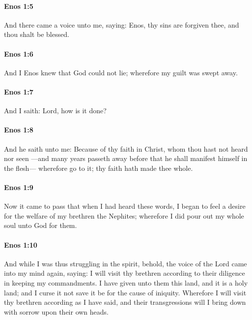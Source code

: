 		\paragraph{Enos 1:5} %
			\label{ENOS-1-5}

			And there came a voice unto me, saying:
			Enos, thy sins are forgiven thee, and thou shalt be blessed.

		\paragraph{Enos 1:6} %
			\label{ENOS-1-6}

			And I Enos knew that God could not lie;
			wherefore my guilt was swept away.

		\paragraph{Enos 1:7} %
			\label{ENOS-1-7}

			And I saith:
			Lord, how is it done?

		\paragraph{Enos 1:8} %
			\label{ENOS-1-8}

			And he saith unto me:
			Because of thy faith in Christ,
			whom thou hast not heard nor seen
			---and many years passeth away
			before that he shall manifest himself in the flesh---
			wherefore go to it;
			thy faith hath made thee whole.

		\paragraph{Enos 1:9} %
			\label{ENOS-1-9}

			Now it came to pass that when I had heard these words,
			I began to feel a desire for the welfare of my brethren the Nephites;
			wherefore I did pour out my whole soul unto God for them.

		\paragraph{Enos 1:10} %
			\label{ENOS-1-10}

			And while I was thus struggling in the spirit,
			behold, the voice of the Lord came into my mind again, saying:
			I will visit thy brethren
			according to their diligence in keeping my commandments.
			I have given unto them this land,
			and it is a holy land;
			and I curse it not save it be for the cause of iniquity.
			Wherefore I will visit thy brethren according as I have said,
			and their transgressions will I bring down with sorrow upon their own heads.

